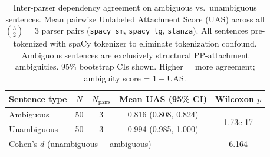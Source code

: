 \begin{table}[h]
\centering
\caption{Inter-parser dependency agreement on ambiguous vs.\ unambiguous sentences. Mean pairwise Unlabeled Attachment Score (UAS) across all $\binom{3}{2} = 3$ parser pairs (\texttt{spacy_sm}, \texttt{spacy_lg}, \texttt{stanza}). All sentences pre-tokenized with spaCy tokenizer to eliminate tokenization confound. Ambiguous sentences are exclusively structural PP-attachment ambiguities. 95\% bootstrap CIs shown. Higher = more agreement; ambiguity score = $1 - \mathrm{UAS}$.}
\label{tab:parser_disagreement}
\begin{tabular}{lcccc}
\toprule
Sentence type & $N$ & $N_{\text{pairs}}$ & Mean UAS (95\% CI) & Wilcoxon $p$ \\
\midrule
Ambiguous    & 50 & 3 & 0.816 (0.808, 0.824) & \multirow{2}{*}{1.73e-17} \\
Unambiguous  & 50 & 3 & 0.994 (0.985, 1.000) & \\
\midrule
\multicolumn{4}{l}{Cohen's $d$ (unambiguous $-$ ambiguous)} & 6.164 \\
\bottomrule
\end{tabular}
\end{table}

